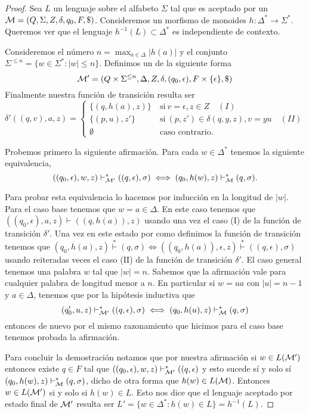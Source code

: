 \documentclass[tesis.tex]{subfiles}
\begin{document}
\begin{proof}
	Sea $L$ un lenguaje \ic sobre el alfabeto $\Sigma$ tal que es aceptado por un \APND ${\cal M } = (Q, \Sigma, Z, \delta, q_0, F, \$)$.
	Consideremos un morfismo de monoides $h: \Delta^* \to \Sigma^*$. 
	Queremos ver que el lenguaje $h^{-1}(L) \subset \Delta^*$ es independiente de contexto.
	 
	Consideremos el número $ n = \max_{a \in \Delta} |h(a)|$ y el conjunto $\Sigma^{\le n} = \{ w \in \Sigma^* : |w| \le n  \}$.	
	Definimos un \APND de la siguiente forma
	\[
	{\cal M' } = (Q \times \Sigma^{\le n}, \Delta, Z, \delta, (q_0, \epsilon), F \times \{ \epsilon \}, \$)
	\]
	Finalmente nuestra función de transición resulta ser 
	\[
	\delta'((q,v), a ,z) = 
	\begin{cases}
		\{(q,h(a), z )\}  \ &\text{si} \ v=\epsilon, z \in Z \quad (I)\\
		\{(p,u),z' \} \ &\text{si} \ (p,z') \in \delta(q,y,z), v=yu \quad (II) \\  
		\emptyset \ &\text{caso contrario}.
	\end{cases}
	\]
	
	Probemos primero la siguiente afirmación.
	Para cada $w \in \Delta^*$ tenemos la siguiente equivalencia,
	\[
	((q_0, \epsilon),w,z) \vdash^*_{\cal M'} ((q,\epsilon), \sigma) \iff (q_0,h(w), z) \vdash^*_{\cal M} (q, \sigma).
	\]
	
	Para probar esta equivalencia lo hacemos por inducción en la longitud de $|w|$.
	Para el caso base tenemos que $w = a \in \Delta$.
	En este caso tenemos que $((q_0, \epsilon), a, z) \vdash ((q,h(a)), z)$ usando una vez el caso (I) de la función de transición $\delta'$.
	Una vez en este estado por como definimos la función de transición tenemos que $ (q_0,h(a), z) \overset{*}{\vdash }(q, \sigma)  \iff ((q_0,h(a)), \epsilon ,z) \overset{*}{\vdash} ((q,\epsilon), \sigma)$ usando reiteradas veces el caso (II) de la función de transición $\delta'$.
	El caso general tenemos una palabra $w$ tal que $|w|=n$.
	Sabemos que la afirmación vale para cualquier palabra de longitud menor a $n$.
	En particular si $w=ua$ con $|u|=n-1$ y $a \in \Delta$, tenemos que por la hipótesis inductiva que 
	\[
	(q_0',u,z) \vdash^*_{\cal M'} ((q,\epsilon), \sigma) \iff (q_0,h(u), z) \vdash^*_{\cal M} (q, \sigma)
	\]
	entonces de nuevo por el mismo razonamiento que hicimos para el caso base tenemos probada la afirmación.
	
	Para concluir la demostración notamos que por nuestra afirmación si $w \in L(\cal M')$ entonces existe $q \in F$ tal que $ ((q_0, \epsilon),w,z) \vdash^*_{\cal M'} ((q,\epsilon) $ y esto sucede sí y solo sí $(q_0,h(w), z) \vdash^*_{\cal M} (q, \sigma)$, dicho de otra forma que $h(w) \in L(\cal M)$.	
	Entonces $w \in L(\cal M')$ si y solo si $h(w) \in L$.
	Esto nos dice que el lenguaje aceptado por estado final de $\cal M'$ resulta ser $L' = \{ w \in \Delta^* : h(w) \in L \} = h^{-1}(L)$.
\end{proof}
\end{document}
